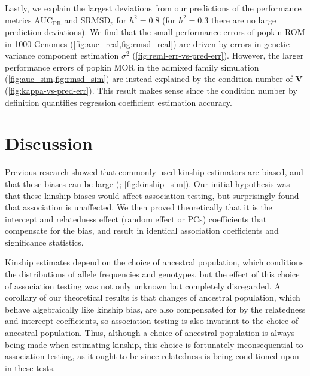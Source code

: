 \documentclass[11pt]{article}
\newcommand{\rmsd}{\text{SRMSD}_p}
\newcommand{\auc}{\text{AUC}_\text{PR}}
\begin{document}
\begin{linenumbers}
Lastly, we explain the largest deviations from our predictions of the performance metrics $\auc$ and $\rmsd$ for $h^2=0.8$ (for $h^2=0.3$ there are no large prediction deviations).
We find that the small performance errors of popkin ROM in 1000 Genomes (\cref{fig:auc_real,fig:rmsd_real}) are driven by errors in genetic variance component estimation $\sigma^2$ (\cref{fig:reml-err-vs-pred-err}).
However, the larger performance errors of popkin MOR in the admixed family simulation (\cref{fig:auc_sim,fig:rmsd_sim}) are instead explained by the condition number of $\mathbf{V}$ (\cref{fig:kappa-vs-pred-err}).
This result makes sense since the condition number by definition quantifies regression coefficient estimation accuracy.

\section{Discussion}

Previous research showed that commonly used kinship estimators are biased, and that these biases can be large (\citet{ochoa_estimating_2021}; \cref{fig:kinship_sim}).
Our initial hypothesis was that these kinship biases would affect association testing, but surprisingly found that association is unaffected.
We then proved theoretically that it is the intercept and relatedness effect (random effect or PCs) coefficients that compensate for the bias, and result in identical association coefficients and significance statistics.

Kinship estimates depend on the choice of ancestral population, which conditions the distributions of allele frequencies and genotypes, but the effect of this choice of association testing was not only unknown but completely disregarded.
A corollary of our theoretical results is that changes of ancestral population, which behave algebraically like kinship bias, are also compensated for by the relatedness and intercept coefficients, so association testing is also invariant to the choice of ancestral population.
Thus, although a choice of ancestral population is always being made when estimating kinship, this choice is fortunately inconsequential to association testing, as it ought to be since relatedness is being conditioned upon in these tests.


\end{linenumbers}
\end{document}
